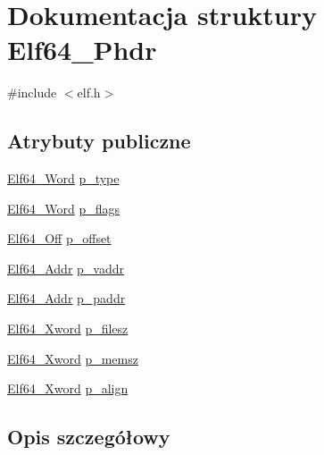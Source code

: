 \hypertarget{struct_elf64___phdr}{\section{Dokumentacja struktury Elf64\-\_\-\-Phdr}
\label{struct_elf64___phdr}
}


{\ttfamily \#include $<$elf.\-h$>$}

\subsection*{Atrybuty publiczne}
\begin{DoxyCompactItemize}
\item 
\hyperlink{elf_8h_aa3aa1920ed115b7ef7e99716fece4401}{Elf64\-\_\-\-Word} \hyperlink{struct_elf64___phdr_aee6ec430eaaf8b8faf82ae6397282cb3}{p\-\_\-type}
\item 
\hyperlink{elf_8h_aa3aa1920ed115b7ef7e99716fece4401}{Elf64\-\_\-\-Word} \hyperlink{struct_elf64___phdr_ab96e7784733c2192a76d5a42897cb38b}{p\-\_\-flags}
\item 
\hyperlink{elf_8h_a6f7837bc80df7a68291fce54ff088849}{Elf64\-\_\-\-Off} \hyperlink{struct_elf64___phdr_aa2d51fb4517ded0c74903f8d0c9abea7}{p\-\_\-offset}
\item 
\hyperlink{elf_8h_aeed51d08e3a950d637f8ec1f0cd4ef65}{Elf64\-\_\-\-Addr} \hyperlink{struct_elf64___phdr_a5c69879e1229b175020ff011af46fcb9}{p\-\_\-vaddr}
\item 
\hyperlink{elf_8h_aeed51d08e3a950d637f8ec1f0cd4ef65}{Elf64\-\_\-\-Addr} \hyperlink{struct_elf64___phdr_a83f4adb032fc307f5af79bdee5ef692d}{p\-\_\-paddr}
\item 
\hyperlink{elf_8h_a5447a48a3dae0bd24f606415268c6fe4}{Elf64\-\_\-\-Xword} \hyperlink{struct_elf64___phdr_af50e5756da2acda5ccb02ebaa3367092}{p\-\_\-filesz}
\item 
\hyperlink{elf_8h_a5447a48a3dae0bd24f606415268c6fe4}{Elf64\-\_\-\-Xword} \hyperlink{struct_elf64___phdr_a55fae01175fc4e3f1c23e52b14459235}{p\-\_\-memsz}
\item 
\hyperlink{elf_8h_a5447a48a3dae0bd24f606415268c6fe4}{Elf64\-\_\-\-Xword} \hyperlink{struct_elf64___phdr_aa89a4b1835998c8866e821d777a2f879}{p\-\_\-align}
\end{DoxyCompactItemize}


\subsection{Opis szczegółowy}


